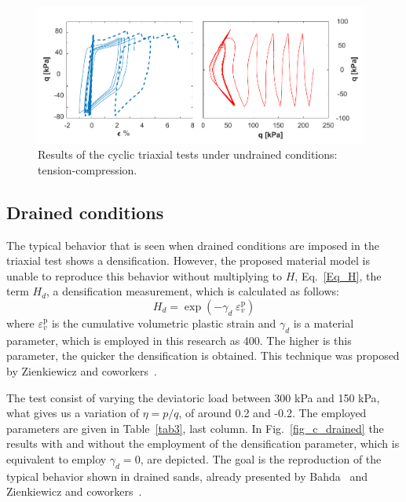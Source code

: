 \documentclass[preprint,12pt,a4paper]{elsarticle}
\begin{document}
\begin{figure}
\centering
\includegraphics[width=0.98\textwidth]{Figs/ciclo_undrained_2.pdf}
\caption{Results of the cyclic triaxial tests under undrained conditions: tension-compression.}
\label{fig_c_undrained2}
\end{figure}


\subsection{Drained conditions}
\label{subsec:42}
The typical behavior that is seen when drained conditions are imposed in the triaxial test shows a densification. However, the proposed material model is unable to reproduce this behavior without multiplying to $H$, Eq.~\eqref{Eq_H}, the term $H_d$, a densification measurement, which is calculated as follows:
\begin{equation}
H_{d}=\exp \left(-\gamma_{d} \; \varepsilon_{v}^{\mathrm{p}} \right)
\end{equation}
where $\varepsilon_{v}^{\mathrm{p}}$ is the cumulative volumetric plastic strain and $\gamma_{d}$ is a material parameter, which is employed in this research as 400. The higher is this parameter, the quicker the densification is obtained. This technique was proposed by Zienkiewicz and coworkers~\cite{Zienkiewicz99}.

The test consist of varying the deviatoric load between 300 kPa and 150 kPa, what gives us a variation of $\eta=p/q$, of around 0.2 and -0.2. The employed parameters are given in Table~\ref{tab3}, last column. In Fig.~\ref{fig_c_drained} the results with and without the employment of the densification parameter, which is equivalent to employ $\gamma_{d}=0$, are depicted. The goal is the reproduction of the typical behavior shown in drained sands, already presented by Bahda~\cite{bahda1997} and Zienkiewicz and coworkers~\cite{Zienkiewicz99}. 
\end{document}
